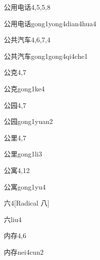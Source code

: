 \begin{entry}{公用电话}{4,5,5,8}
  \begin{phonetics}{公用电话}{gong1yong4dian4hua4}
  \end{phonetics}
\end{entry}

\begin{entry}{公共汽车}{4,6,7,4}
  \begin{phonetics}{公共汽车}{gong1gong4qi4che1}
  \end{phonetics}
\end{entry}

\begin{entry}{公克}{4,7}
  \begin{phonetics}{公克}{gong1ke4}
  \end{phonetics}
\end{entry}

\begin{entry}{公园}{4,7}
  \begin{phonetics}{公园}{gong1yuan2}
  \end{phonetics}
\end{entry}

\begin{entry}{公里}{4,7}
  \begin{phonetics}{公里}{gong1li3}
  \end{phonetics}
\end{entry}

\begin{entry}{公寓}{4,12}
  \begin{phonetics}{公寓}{gong1yu4}
  \end{phonetics}
\end{entry}

\begin{entry}{六}{4}[Radical 八]
  \begin{phonetics}{六}{liu4}
  \end{phonetics}
\end{entry}

\begin{entry}{内存}{4,6}
  \begin{phonetics}{内存}{nei4cun2}
  \end{phonetics}
\end{entry}

